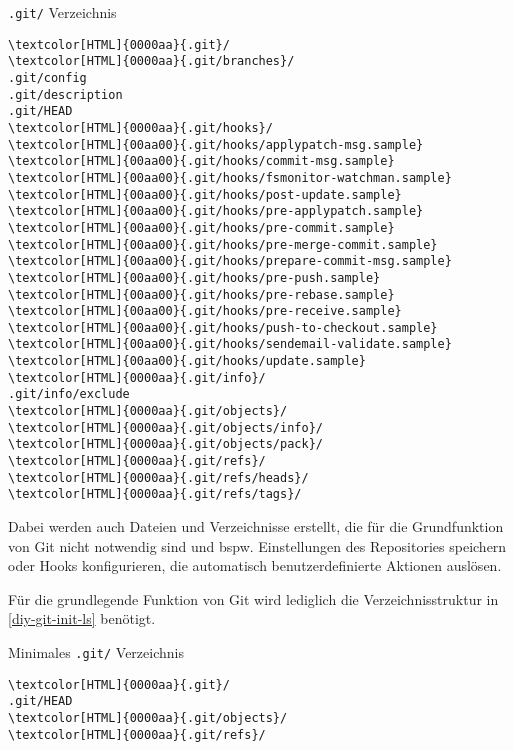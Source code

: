 \documentclass[
	nonacm,%
	screen,%
	sigplan,
]{acmart}
\begin{document}
\begin{example}
	\caption{\texttt{.git/} Verzeichnis}%
	\label{git-init-ls}%
	\begin{Verbatim}[commandchars=\\\{\},fontsize=\small]
\textcolor[HTML]{0000aa}{.git}/
\textcolor[HTML]{0000aa}{.git/branches}/
.git/config
.git/description
.git/HEAD
\textcolor[HTML]{0000aa}{.git/hooks}/
\textcolor[HTML]{00aa00}{.git/hooks/applypatch-msg.sample}
\textcolor[HTML]{00aa00}{.git/hooks/commit-msg.sample}
\textcolor[HTML]{00aa00}{.git/hooks/fsmonitor-watchman.sample}
\textcolor[HTML]{00aa00}{.git/hooks/post-update.sample}
\textcolor[HTML]{00aa00}{.git/hooks/pre-applypatch.sample}
\textcolor[HTML]{00aa00}{.git/hooks/pre-commit.sample}
\textcolor[HTML]{00aa00}{.git/hooks/pre-merge-commit.sample}
\textcolor[HTML]{00aa00}{.git/hooks/prepare-commit-msg.sample}
\textcolor[HTML]{00aa00}{.git/hooks/pre-push.sample}
\textcolor[HTML]{00aa00}{.git/hooks/pre-rebase.sample}
\textcolor[HTML]{00aa00}{.git/hooks/pre-receive.sample}
\textcolor[HTML]{00aa00}{.git/hooks/push-to-checkout.sample}
\textcolor[HTML]{00aa00}{.git/hooks/sendemail-validate.sample}
\textcolor[HTML]{00aa00}{.git/hooks/update.sample}
\textcolor[HTML]{0000aa}{.git/info}/
.git/info/exclude
\textcolor[HTML]{0000aa}{.git/objects}/
\textcolor[HTML]{0000aa}{.git/objects/info}/
\textcolor[HTML]{0000aa}{.git/objects/pack}/
\textcolor[HTML]{0000aa}{.git/refs}/
\textcolor[HTML]{0000aa}{.git/refs/heads}/
\textcolor[HTML]{0000aa}{.git/refs/tags}/
	\end{Verbatim}
\end{example}

Dabei werden auch Dateien und Verzeichnisse erstellt, die für die Grundfunktion von Git nicht notwendig sind und bspw. Einstellungen des Repositories speichern oder Hooks \cite{githooks} konfigurieren, die automatisch benutzerdefinierte Aktionen auslösen.

Für die grundlegende Funktion von Git wird lediglich die Verzeichnisstruktur in \autoref{diy-git-init-ls} benötigt.

\begin{example}
	\caption{Minimales \texttt{.git/} Verzeichnis}%
	\label{diy-git-init-ls}%
	\begin{Verbatim}[commandchars=\\\{\},fontsize=\small]
\textcolor[HTML]{0000aa}{.git}/
.git/HEAD
\textcolor[HTML]{0000aa}{.git/objects}/
\textcolor[HTML]{0000aa}{.git/refs}/
	\end{Verbatim}
\end{example}
\end{document}
